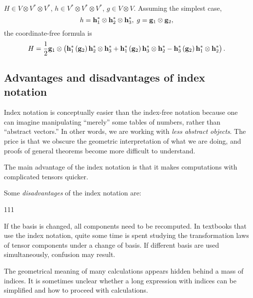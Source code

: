 \begin{solu}
$H\in V\otimes V^{*}\otimes V^{*}$, $h\in V^{*}\otimes V^{*}\otimes V^{*}$,
$g\in V\otimes V$. Assuming the simplest case,\[
h=\mathbf{ h}_{1}^{*}\otimes\mathbf{ h}_{2}^{*}\otimes\mathbf{ h}_{3}^{*},\; g=\mathbf{ g}_{1}\otimes\mathbf{ g}_{2},\]
the coordinate-free formula is\[
H=\dfrac{1}{2}\mathbf{ g}_{1}\otimes\left(\mathbf{ h}_{1}^{*}\left(\mathbf{ g}_{2}\right)\mathbf{ h}_{2}^{*}\otimes\mathbf{ h}_{3}^{*}+\mathbf{ h}_{1}^{*}\left(\mathbf{ g}_{2}\right)\mathbf{ h}_{3}^{*}\otimes\mathbf{ h}_{2}^{*}-\mathbf{ h}_{3}^{*}\left(\mathbf{ g}_{2}\right)\mathbf{ h}_{1}^{*}\otimes\mathbf{ h}_{2}^{*}\right).\]
\end{solu}








\subsection{Advantages and disadvantages of index notation}

Index notation is conceptually easier than the index-free notation
because one can imagine manipulating ``merely'' some tables of
numbers, rather than ``abstract vectors.'' In other words, we
are working with \textit{less abstract objects}. The price is that we obscure
the geometric interpretation of what we are doing, and proofs of general
theorems become more difficult to understand.

The main advantage of the index notation is that it makes computations
 with complicated tensors quicker. 

Some \emph{disadvantages} of the index notation are: 

\begin{dinglist}{111}
 \item If the basis is changed, all components need to be recomputed. In
textbooks that use the index notation, quite some time is spent studying
the transformation laws of tensor components under a change of basis.
If different basis are used simultaneously, confusion may result.


\item  The geometrical meaning of many calculations appears hidden behind
a mass of indices. It is sometimes unclear whether a long expression
with indices can be simplified and how to proceed with calculations.

\end{dinglist}

